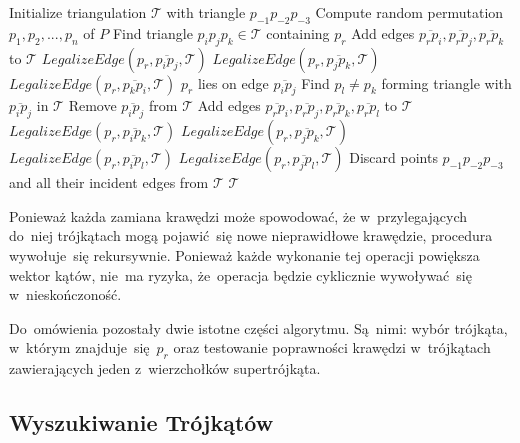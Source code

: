 \documentclass[skorowidz,autorrok,backref,xodstep,oswiadczenie]{wmimgr}
\begin{document}
\begin{algorithm}
\caption{$DelaunayTriangulation(P)$ \cite{geometria}}
\label{DelaunayTriangulation}
\begin{algorithmic}
    \STATE Initialize triangulation $\mathcal{T}$ with triangle $p_{-1} p_{-2} p_{-3}$
    \STATE Compute random permutation $p_{1}, p_{2}, ..., p_{n}$ of $P$
        \STATE Find triangle $p_{i} p_{j} p_{k} \in \mathcal{T}$ containing $p_{r}$
            \STATE Add edges $\overline{p_{r} p_{i}}, \overline{p_{r} p_{j}}, \overline{p_{r} p_{k}}$ to $\mathcal{T}$
            \STATE $LegalizeEdge(p_{r}, \overline{p_{i} p_{j}}, \mathcal{T})$
            \STATE $LegalizeEdge(p_{r}, \overline{p_{j} p_{k}}, \mathcal{T})$
            \STATE $LegalizeEdge(p_{r}, \overline{p_{k} p_{i}}, \mathcal{T})$
        \ELSE
            \STATE $p_{r}$ lies on edge $\overline{p_{i} p_{j}}$
            \STATE Find $p_{l} \neq p_{k}$ forming triangle with $\overline{p_{i} p_{j}}$ in $\mathcal{T}$
            \STATE Remove $\overline{p_{i} p_{j}}$ from $\mathcal{T}$
            \STATE Add edges $\overline{p_{r} p_{i}}, \overline{p_{r} p_{j}}, \overline{p_{r} p_{k}}, \overline{p_{r} p_{l}}$ to $\mathcal{T}$
            \STATE $LegalizeEdge(p_{r}, \overline{p_{i} p_{k}}, \mathcal{T})$
            \STATE $LegalizeEdge(p_{r}, \overline{p_{j} p_{k}}, \mathcal{T})$
            \STATE $LegalizeEdge(p_{r}, \overline{p_{i} p_{l}}, \mathcal{T})$
            \STATE $LegalizeEdge(p_{r}, \overline{p_{j} p_{l}}, \mathcal{T})$
        \ENDIF
    \ENDFOR
    \STATE Discard points $p_{-1} p_{-2} p_{-3}$ and all their incident edges from $\mathcal{T}$
    \RETURN $\mathcal{T}$
\end{algorithmic}
\end{algorithm}

Ponieważ każda zamiana krawędzi może spowodować, że w~przylegających do~niej trójkątach mogą pojawić~się nowe nieprawidłowe krawędzie, procedura wywołuje~się rekursywnie. Ponieważ każde wykonanie tej operacji powiększa wektor kątów, nie~ma ryzyka, że~operacja będzie cyklicznie wywoływać~się w~nieskończoność.

Do~omówienia pozostały dwie istotne części algorytmu. Są~nimi: wybór trójkąta, w~którym znajduje~się~$p_{r}$ oraz testowanie poprawności krawędzi w~trójkątach zawierających jeden z~wierzchołków supertrójkąta.

\subsection{Wyszukiwanie Trójkątów}
\end{document}

